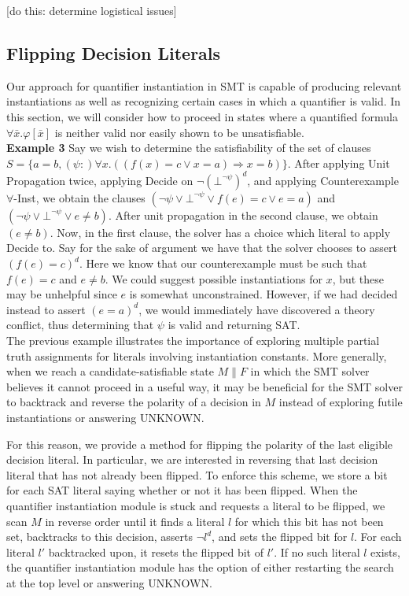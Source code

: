 \documentclass{llncs}
\begin{document}
[do this: determine logistical issues]

\subsection{Flipping Decision Literals}

Our approach for quantifier instantiation in SMT is capable of producing relevant instantiations as well as recognizing certain cases in which a quantifier is valid. 
In this section, we will consider how to proceed in states where a quantified formula $\forall \bar{x}. \varphi[ \bar{x} ]$ is neither valid nor easily shown to be unsatisfiable. \\

{\bf Example 3} 
Say we wish to determine the satisfiability of the set of clauses $S = \{ a = b, (\psi :) \forall x. ((f(x) = c \vee x = a) \Rightarrow x = b) \}$.
After applying Unit Propagation twice, applying Decide on $\neg (\bot^{ \neg \psi })^d$, and applying Counterexample $\forall$-Inst, we obtain the clauses $( \neg \psi \vee \bot^{ \neg \psi } \vee f(e) = c \vee e = a )$ and $( \neg \psi \vee \bot^{ \neg \psi } \vee e \neq b )$.
After unit propagation in the second clause, we obtain $( e \neq b )$.
Now, in the first clause, the solver has a choice which literal to apply Decide to.
Say for the sake of argument we have that the solver chooses to assert $( f(e) = c )^d$.
Here we know that our counterexample must be such that $f( e ) = c$ and $e \neq b$.
We could suggest possible instantiations for $x$, but these may be unhelpful since $e$ is somewhat unconstrained.
However, if we had decided instead to assert $( e = a )^d$, we would immediately have discovered a theory conflict, thus determining that $\psi$ is valid and returning SAT. \\

The previous example illustrates the importance of exploring multiple partial truth assignments for literals involving instantiation constants.
More generally, when we reach a candidate-satisfiable state $M \parallel F$ in which the SMT solver believes it cannot proceed in a useful way, it may be beneficial for the SMT solver to backtrack and reverse the polarity of a decision in $M$ instead of exploring futile instantiations or answering UNKNOWN.

For this reason, we provide a method for flipping the polarity of the last eligible decision literal.
In particular, we are interested in reversing that last decision literal that has not already been flipped.
To enforce this scheme, we store a bit for each SAT literal saying whether or not it has been flipped.
When the quantifier instantiation module is stuck and requests a literal to be flipped, we scan $M$ in reverse order until it finds a literal $l$ for which this bit has not been set, backtracks to this decision, asserts $\neg l^d$, and sets the flipped bit for $l$.
For each literal $l'$ backtracked upon, it resets the flipped bit of $l'$.
If no such literal $l$ exists, the quantifier instantiation module has the option of either restarting the search at the top level or answering UNKNOWN.
\end{document}
